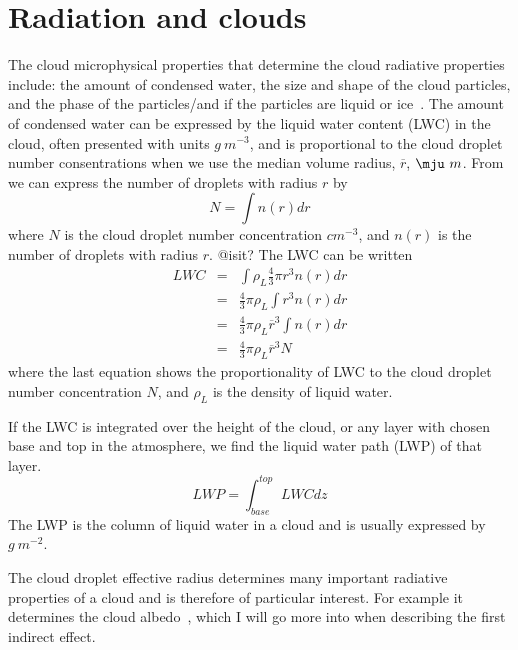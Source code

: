 \section{Radiation and clouds}
The cloud microphysical properties that determine the cloud radiative properties include: the amount of condensed water, the size and shape of the cloud particles, and the phase of the particles/and if the particles are liquid or ice~\citep{Curry1996}. The amount of condensed water can be expressed by the liquid water content (LWC) in the cloud, often presented with units $g~m^{-3}$, and is proportional to the cloud droplet number consentrations when we use the median volume radius, $\overline{r}$, $\mju~m$. From~\cite{Rogers1989} we can express the number of droplets with radius $r$ by
\begin{equation}
N = \int n(r) dr
\end{equation}
where $N$ is the cloud droplet number concentration $cm^{-3}$, and $n(r)$ is the number of droplets with radius $r$. @isit?
The LWC can be written
\begin{eqnarray}
LWC &=& \int \rho_L \frac{4}{3} \pi r^3 n(r) dr\\
&=& \frac{4}{3} \pi \rho_L \int r^3 n(r) dr\\
&=& \frac{4}{3} \pi \rho_L \overline{r}^3 \int n(r) dr\\
&=& \frac{4}{3} \pi \rho_L \overline{r}^3 N 
\end{eqnarray}
where the last equation shows the proportionality of LWC to the cloud droplet number concentration $N$, and $\rho_L$ is the density of liquid water.

If the LWC is integrated over the height of the cloud, or any layer with chosen base and top in the atmosphere, we find the liquid water path (LWP) of that layer.
\begin{equation}
LWP = \int_{base}^{top} LWC dz
\end{equation}
The LWP is the column of liquid water in a cloud and is usually expressed by $g~m^{-2}$.


The cloud droplet effective radius determines many important radiative properties of a cloud and is therefore of particular interest. For example it determines the cloud albedo~\citep{Hansen1974}, which I will go more into when describing the first indirect effect.



